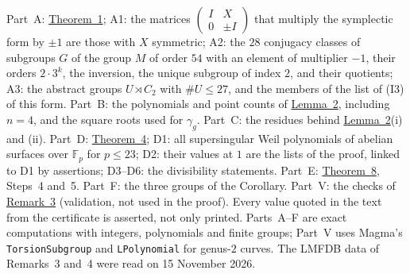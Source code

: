 \documentclass[11pt]{article}
\newcommand{\F}{\mathbb F}
\newcommand{\sd}{\mathbin{\rtimes}}
\begin{document}
Part~A: \hyperref[thm-full3]{Theorem~1}; A1: the matrices
\(\left(\begin{smallmatrix}I&X\\0&\pm I\end{smallmatrix}\right)\) that multiply the symplectic form by \(\pm1\) are
those with \(X\) symmetric; A2: the \(28\) conjugacy classes of subgroups \(G\) of the group \(M\) of order \(54\)
with an element of multiplier \(-1\), their orders \(2\cdot3^k\), the inversion, the unique subgroup of index \(2\),
and their quotients; A3: the abstract groups \(U\sd C_2\) with \(\#U\le27\), and the members of the list of (I3) of
this form. Part~B: the polynomials and point counts of \hyperref[lemma-shapes]{Lemma~2}, including \(n=4\), and the
square roots used for \(\gamma_g\). Part~C: the residues behind \hyperref[lemma-shapes]{Lemma~2}(i) and (ii).
Part~D: \hyperref[thm-cm]{Theorem~4}; D1: all supersingular Weil polynomials of abelian surfaces over \(\F_p\) for
\(p\le23\); D2: their values at \(1\) are the lists of the proof, linked to D1 by assertions; D3--D6: the
divisibility statements. Part~E: \hyperref[thm-inertia]{Theorem~8}, Steps~4 and~5. Part~F: the three groups of the
Corollary. Part~V: the checks of \hyperref[rem-hyp]{Remark~3} (validation, not used in the proof). Every value
quoted in the text from the certificate is asserted, not only printed. Parts~A--F are exact computations with
integers, polynomials and finite groups; Part~V uses Magma's \texttt{TorsionSubgroup} and
\texttt{LPolynomial} for genus-\(2\) curves. The LMFDB data of Remarks~3 and~4 were read on 15 November 2026.
\end{document}
